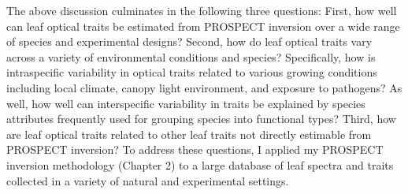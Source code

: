 The above discussion culminates in the following three questions:
First, how well can leaf optical traits be estimated from PROSPECT inversion over a wide range of species and experimental designs?
Second, how do leaf optical traits vary across a variety of environmental conditions and species?
Specifically, how is intraspecific variability in optical traits related to various growing conditions including local climate, canopy light environment, and exposure to pathogens?
As well, how well can interspecific variability in traits be explained by species attributes frequently used for grouping species into functional types? 
Third, how are leaf optical traits related to other leaf traits not directly estimable from PROSPECT inversion?
To address these questions, I applied my PROSPECT inversion methodology (Chapter 2) to a large database of leaf spectra and traits collected in a variety of natural and experimental settings.
